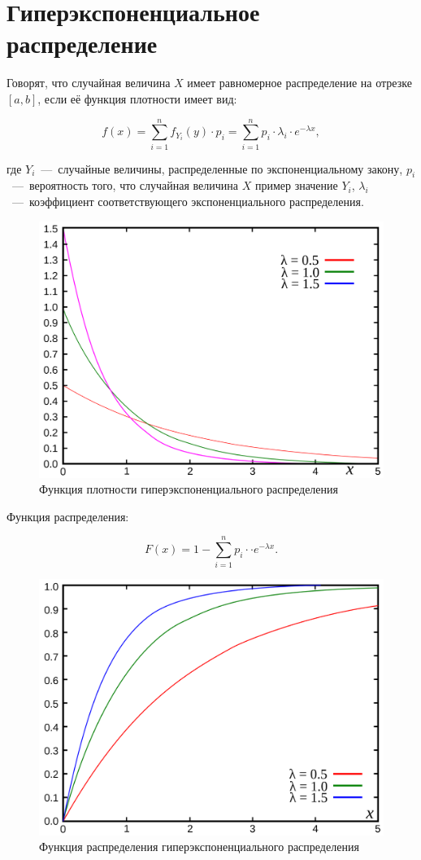 \section{Гиперэкспоненциальное распределение}

Говорят, что случайная величина $X$ имеет равномерное распределение на отрезке $[a,b]$, если её функция плотности имеет вид:

\begin{equation}
    f (x) = \sum_{i=1}^{n} f_{Y_i}(y) \cdot p_i = \sum_{i=1}^{n} p_i \cdot \lambda_i \cdot e^{-\lambda x},
\end{equation}

\noindent где $Y_i$~---~случайные величины, распределенные по экспоненциальному закону, $p_i$~---~вероятность того, что случайная величина $X$ пример значение $Y_i$, $\lambda_i$~---~коэффициент соответствующего экспоненциального распределения.

\begin{figure}[H]
    \begin{center}
    \includegraphics[width=0.5\linewidth]{inc/hyp_f.png}
    \caption{Функция плотности гиперэкспоненциального распределения}
    \label{fig:}
    \end{center}
\end{figure}

\newpage

Функция распределения:

\begin{equation}
F (x) = 1 - \sum_{i=1}^{n} p_i \cdot \cdot e^{-\lambda x}.
\end{equation}

\begin{figure}[H]
    \begin{center}
    \includegraphics[width=0.5\linewidth]{inc/hyp_Fx.png}
    \caption{Функция распределения гиперэкспоненциального распределения}
    \label{fig:}
    \end{center}
\end{figure}
